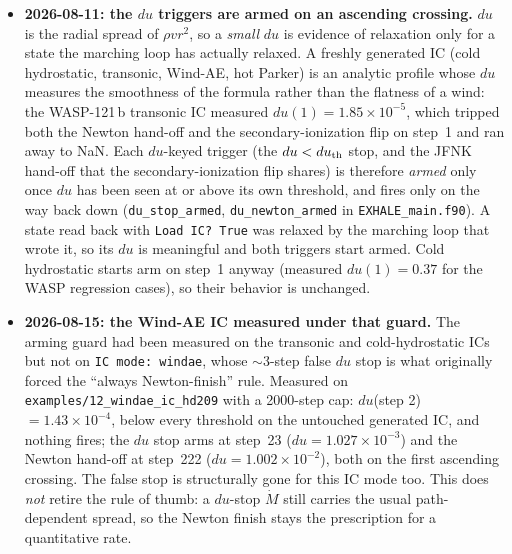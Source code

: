 \documentclass[english,a4paper]{my_memo}
\begin{document}
\begin{itemize}
  stability) and the residual, volume-weighted by default
  (\texttt{resid\_vol} in \texttt{parameters.f90}), since the L-$\infty$ max is
  inflated by the small near-base cells, is printed each \texttt{N\_resid}
  steps as a diagnostic. The \texttt{verdict} column of the table below
  therefore reads \texttt{flux-conv}, not ``JFNK fail'', for runs that are
  flux-converged but whose residual finish did not reach the target.
\item \textbf{2026-08-11: the $du$ triggers are armed on an ascending crossing.}
  $du$ is the radial spread of $\rho v r^2$, so a \emph{small} $du$ is evidence
  of relaxation only for a state the marching loop has actually relaxed. A
  freshly generated IC (cold hydrostatic, transonic, Wind-AE, hot Parker)
  is an analytic profile whose $du$ measures the smoothness of the formula
  rather than the flatness of a wind: the WASP-121\,b transonic IC measured
  $du(1) = 1.85\times10^{-5}$, which tripped both the Newton hand-off and the
  secondary-ionization flip on step~1 and ran away to NaN. Each $du$-keyed
  trigger (the $du < du_{\rm th}$ stop, and the JFNK hand-off that the
  secondary-ionization flip shares) is therefore \emph{armed} only once $du$
  has been seen at or above its own threshold, and fires only on the way back
  down (\texttt{du\_stop\_armed}, \texttt{du\_newton\_armed} in
  \texttt{EXHALE\_main.f90}). A state read back with \texttt{Load IC? True} was
  relaxed by the marching loop that wrote it, so its $du$ is meaningful and both
  triggers start armed. Cold hydrostatic starts arm on step~1 anyway
  (measured $du(1) = 0.37$ for the WASP regression cases), so their behavior is
  unchanged.
\item \textbf{2026-08-15: the Wind-AE IC measured under that guard.} The
  arming guard had been measured on the transonic and cold-hydrostatic ICs but
  not on \texttt{IC mode: windae}, whose ${\sim}3$-step false $du$ stop is what
  originally forced the ``always Newton-finish'' rule. Measured on
  \texttt{examples/12\_windae\_ic\_hd209} with a 2000-step cap:
  $du$(step 2) $= 1.43\times10^{-4}$, below every threshold on the untouched
  generated IC, and nothing fires; the $du$ stop arms at step~23
  ($du = 1.027\times10^{-3}$) and the Newton hand-off at step~222
  ($du = 1.002\times10^{-2}$), both on the first ascending crossing. The false
  stop is structurally gone for this IC mode too. This does \emph{not} retire
  the rule of thumb: a $du$-stop $\dot M$ still carries the usual
  path-dependent spread, so the Newton finish stays the prescription for a
  quantitative rate.
\end{itemize}
\end{document}
